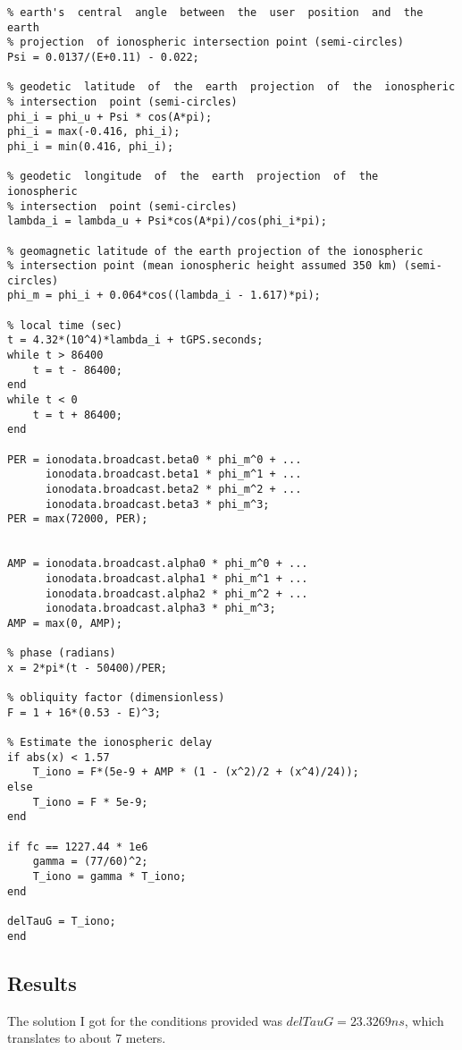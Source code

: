 \begin{lstlisting}
% earth's  central  angle  between  the  user  position  and  the  earth  
% projection  of ionospheric intersection point (semi-circles) 
Psi = 0.0137/(E+0.11) - 0.022;

% geodetic  latitude  of  the  earth  projection  of  the  ionospheric  
% intersection  point (semi-circles) 
phi_i = phi_u + Psi * cos(A*pi);
phi_i = max(-0.416, phi_i);
phi_i = min(0.416, phi_i);

% geodetic  longitude  of  the  earth  projection  of  the  ionospheric  
% intersection  point (semi-circles) 
lambda_i = lambda_u + Psi*cos(A*pi)/cos(phi_i*pi);

% geomagnetic latitude of the earth projection of the ionospheric 
% intersection point (mean ionospheric height assumed 350 km) (semi-circles) 
phi_m = phi_i + 0.064*cos((lambda_i - 1.617)*pi);

% local time (sec) 
t = 4.32*(10^4)*lambda_i + tGPS.seconds;
while t > 86400
    t = t - 86400;
end
while t < 0
    t = t + 86400;
end

PER = ionodata.broadcast.beta0 * phi_m^0 + ...
      ionodata.broadcast.beta1 * phi_m^1 + ...
      ionodata.broadcast.beta2 * phi_m^2 + ...
      ionodata.broadcast.beta3 * phi_m^3;
PER = max(72000, PER);


AMP = ionodata.broadcast.alpha0 * phi_m^0 + ...
      ionodata.broadcast.alpha1 * phi_m^1 + ...
      ionodata.broadcast.alpha2 * phi_m^2 + ...
      ionodata.broadcast.alpha3 * phi_m^3;
AMP = max(0, AMP);

% phase (radians) 
x = 2*pi*(t - 50400)/PER;

% obliquity factor (dimensionless) 
F = 1 + 16*(0.53 - E)^3;

% Estimate the ionospheric delay
if abs(x) < 1.57
    T_iono = F*(5e-9 + AMP * (1 - (x^2)/2 + (x^4)/24));
else
    T_iono = F * 5e-9;
end

if fc == 1227.44 * 1e6
    gamma = (77/60)^2;
    T_iono = gamma * T_iono;
end

delTauG = T_iono;
end
\end{lstlisting}

\subsection{Results}

The solution I got for the conditions provided was $delTauG = 23.3269 ns$, which
translates to about 7 meters.
